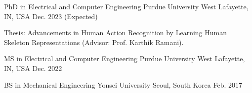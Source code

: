 


\begin{cventries}


    \cventry
    {PhD in Electrical and Computer Engineering} %
    {Purdue University} %
    {West Lafayette, IN, USA} %
    {Dec. 2023 (Expected)} %
    { %
    \begin{cvitems}
        \item {Thesis: Advancements in Human Action Recognition by Learning Human Skeleton Representations (Advisor: Prof. Karthik Ramani).}
    \end{cvitems}
    }

    \cventry
    {MS in Electrical and Computer Engineering} %
    {Purdue University} %
    {West Lafayette, IN, USA} %
    {Dec. 2022} %
    { %
    }
    \vspace{-1em}

    \cventry
    {BS in Mechanical Engineering} %
    {Yonsei University} %
    {Seoul, South Korea} %
    {Feb. 2017} %
    { %
    }
    \vspace{-1.5em}

\end{cventries}
